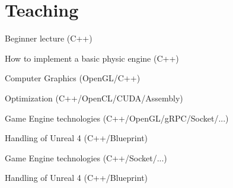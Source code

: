 \documentclass[a4paper]{deedy-resume} %
\begin{document}
\begin{minipage}[t]{0.66\textwidth} %


\section{Teaching}


	\vspace{\topsep} %
	\begin{tightitemize}
		\item Beginner lecture (C++)
		\item How to implement a basic physic engine (C++)
		\item Computer Graphics (OpenGL/C++)
		\item Optimization (C++/OpenCL/CUDA/Assembly)
	\end{tightitemize}

\sectionspace


	\begin{tightitemize}
		\item Game Engine technologies (C++/OpenGL/gRPC/Socket/...)
		\item Handling of Unreal 4 (C++/Blueprint)
	\end{tightitemize}

\sectionspace


	\begin{tightitemize}
		\item Game Engine technologies (C++/Socket/...)
		\item Handling of Unreal 4 (C++/Blueprint)
	\end{tightitemize}


\end{minipage}
\end{document}
